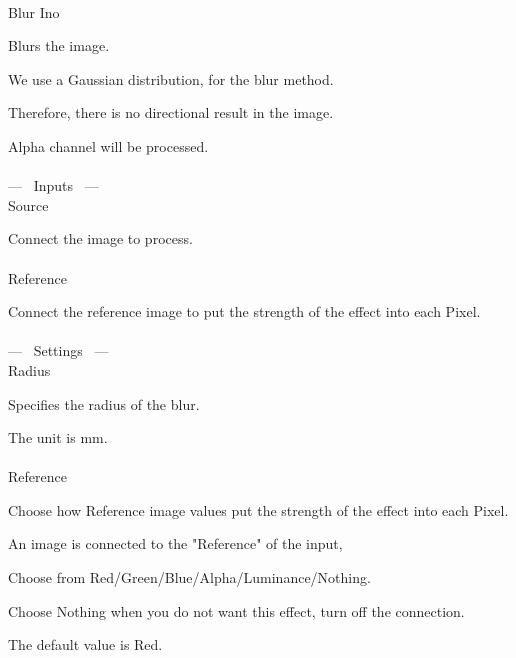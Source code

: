 \documentclass[a4paper,12pt]{article}
\begin{document}
\thispagestyle{empty}

\Large
\noindent \\
Blur Ino\medskip
\par
\normalsize
Blurs the image.\\
\par
We use a Gaussian distribution, for the blur method.\par
Therefore, there is no directional result in the image.\\
\par
Alpha channel will be processed.\\
\\
--- \ Inputs \ ---\\
Source\par
Connect the image to process.\\
\\
Reference\par
Connect the reference image to put the strength of the effect into each Pixel.\\
\\
--- \ Settings \ ---\\
Radius\par
Specifies the radius of the blur.\par
The unit is mm.\\
\\
Reference\par
Choose how Reference image values put the strength of the effect into each Pixel.\par
An image is connected to the "Reference" of the input,\par
Choose from Red/Green/Blue/Alpha/Luminance/Nothing.\par
Choose Nothing when you do not want this effect, turn off the connection.\par
The default value is Red.
\end{document}
